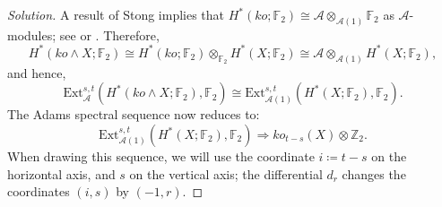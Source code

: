\documentclass{amsart}
\def\ko{\mathit{ko}}
\newcommand{\Ext}{\mathrm{Ext}}
\newcommand{\Steenrod}{\mathcal{A}}
\newcommand{\Aone}{\Steenrod(1)}
\newcommand{\FF}{\mathbb{F}}
\newcommand{\ZZ}{\mathbb{Z}}
\newcommand{\smas}{\wedge}
\newcommand{\defeq}{\coloneqq}
\begin{document}
\begin{proof}[Solution]
A result of Stong \cite{Stong} implies that $H^*(\ko;\FF_2)\cong \Steenrod\otimes_{\Aone}\FF_2$ as
$\Steenrod$-modules; see \cite[Proposition 6.27]{RognesNotes} or \cite[Proposition 16.6]{Adams}. Therefore, 
\[
  H^*(\ko\smas X;\FF_2)\cong H^*(\ko;\FF_2)\otimes_{\FF_2}
  H^*(X;\FF_2)\cong \Steenrod\otimes_{\Aone} H^*(X;\FF_2),
\]
and hence,
\[
  \Ext^{s,t}_\Steenrod(H^*(\ko\smas X;\FF_2),\FF_2)\cong \Ext^{s,t}_{\Aone}(H^*(X;\FF_2),\FF_2).
\]
The Adams spectral sequence now reduces to:
\begin{equation}\label{eq:adams-sseq}
  \Ext^{s,t}_{\Aone}(H^*(X;\FF_2),\FF_2)\Rightarrow ko_{t-s}(X) \otimes \ZZ_2.
\end{equation}
When drawing this sequence, we will use the coordinate $i\defeq t-s$ on
the horizontal axis, and $s$ on the vertical axis; the differential $d_r$ changes the coordinates
$(i, s)$ by $(-1, r)$.




\end{proof}
\end{document}
